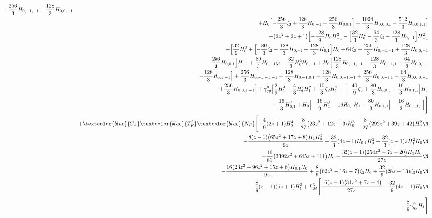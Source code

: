 \begin{eqnarray}
+\frac{256}{3}H_{0,-1,-1}-\frac{128}{3}H_{0,0,-1}
\nonumber \\ &&
+H_0 \Bigl[-\frac{256}{3}  \zeta_3+\frac{128}{3}H_{0,-1}
-\frac{256}{3}  H_{0,0,1}\Bigr]+\frac{1024}{3}  H_{0,0,0,1}-\frac{512}{3} H_{0,0,1,1}\Bigr]
\nonumber \\ &&
+\big(2 z^2+2 z+1\big) \Bigl[-\frac{128}{9} H_0H_{-1}^3+\Bigl[\frac{32}{3} H_0^2-\frac{64}{3} \zeta_2+\frac{128}{3} H_{0,-1}
\Bigr]H_{-1}^2
\nonumber \\ &&
+\Bigl[\frac{32}{9} H_0^3+\Bigl[-\frac{80}{3}\zeta_2-\frac{128}{3} H_{0,-1}
+\frac{128}{3}  H_{0,1}\Bigr] H_0+64 \zeta_3
-\frac{256}{3} H_{0,-1,-1}
+\frac{128}{3} H_{0,0,-1}
\nonumber \\ &&
-\frac{256}{3} H_{0,0,1}\Bigr]H_{-1}
+\frac{80}{3} H_{0,-1} \zeta_2-\frac{32}{3}H_0^2 H_{0,-1}+H_0 \Bigl[\frac{128}{3} H_{0,-1,-1}-\frac{128}{3} H_{0,-1,1}+\frac{64}{3} H_{0,0,-1}
\nonumber \\ &&
-\frac{128}{3} H_{0,1,-1}\Bigr]+\frac{256}{3} H_{0,-1,-1,-1}+\frac{128}{3} H_{0,-1,0,1}
-\frac{128}{3}H_{0,0,-1,-1}
+\frac{256}{3} H_{0,0,-1,1}-\frac{64}{3}H_{0,0,0,-1}
\nonumber \\ &&
+\frac{256}{3} H_{0,0,1,-1}
\Bigr]+{\gamma}_{qg}^{0} \Bigl[\frac{2}{9} H_1^4+\frac{4}{3}H_0^2 H_1^2+\frac{10}{3} \zeta_2 H_1^2
+\Bigl[-\frac{40}{9} \zeta_3+\frac{80}{3} H_{0,0,1}+\frac{16}{3} H_{0,1,1}\Bigr] H_1
\nonumber \\ &&
-\frac{16}{3}H_{0,1}^2+H_0 \Bigl[-\frac{16}{9} H_1^3-16 H_{0,1} H_1+\frac{80}{3}H_{0,1,1}\Bigr]
-\frac{16}{3} H_{0,1,1,1}\Bigr]
\Biggr] 
%
\nonumber \\ &&
+\textcolor{blue}{C_A}  \textcolor{blue}{T_F^2}  \textcolor{blue}{N_F}\Biggl[
-\frac{4}{9} (2 z+1) H_0^4
+\frac{8}{27} \big(23 z^2+12 z+3\big) H_0^3
-\frac{8}{27} \big(292 z^2+39 z+42\big) H_0^2
\N\\&&
-\frac{8 (z-1) \big(65 z^2+17 z+8\big) H_1 H_0^2}{9 z}
+\frac{32}{3} (4 z+1) H_{0,1} H_0^2
+\frac{32}{3} (z-1) z H_1^2 H_0
\N\\&&
+\frac{16}{81} \big(3392 z^2+645 z+111\big) H_0
+\frac{32 (z-1) \big(254 z^2-7 z+20\big) H_1 H_0}{27 z}
\N\\&&
-\frac{16 \big(23 z^3+96 z^2+15 z+8\big) H_{0,1} H_0}{9 z}
+\frac{8}{9} \big(62 z^2-16 z-7\big) \zeta_2 H_0
+\frac{32}{9} (28 z+13) \zeta_3 H_0
\N\\&&
-\frac{8}{9} (z-1) (5 z+1) H_1^3
+ L_M^3 \Biggl[
\frac{16 (z-1) \big(31 z^2+7 z+4\big)}{27 z}
-\frac{32}{9} (4 z+1) H_0
\N\\&&
-\frac{8}{9} {\gamma}_{qg}^{0} H_1\Biggr]

\end{eqnarray}
